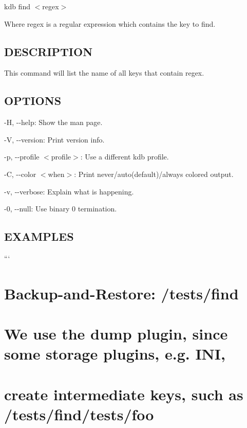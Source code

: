 {\ttfamily kdb find $<$regex$>$}

Where {\ttfamily regex} is a regular expression which contains the key to find.

\subsection*{D\+E\+S\+C\+R\+I\+P\+T\+I\+ON}

This command will list the name of all keys that contain {\ttfamily regex}.

\subsection*{O\+P\+T\+I\+O\+NS}


\begin{DoxyItemize}
\item {\ttfamily -\/H}, {\ttfamily -\/-\/help}\+: Show the man page.
\item {\ttfamily -\/V}, {\ttfamily -\/-\/version}\+: Print version info.
\item {\ttfamily -\/p}, {\ttfamily -\/-\/profile $<$profile$>$}\+: Use a different kdb profile.
\item {\ttfamily -\/C}, {\ttfamily -\/-\/color $<$when$>$}\+: Print never/auto(default)/always colored output.
\item {\ttfamily -\/v}, {\ttfamily -\/-\/verbose}\+: Explain what is happening.
\item {\ttfamily -\/0}, {\ttfamily -\/-\/null}\+: Use binary 0 termination.
\end{DoxyItemize}

\subsection*{E\+X\+A\+M\+P\+L\+ES}

``` \section*{Backup-\/and-\/\+Restore\+: /tests/find}

\section*{We use the {\ttfamily dump} plugin, since some storage plugins, e.\+g. I\+NI,}

\section*{create intermediate keys, such as {\ttfamily /tests/find/tests/foo}}

